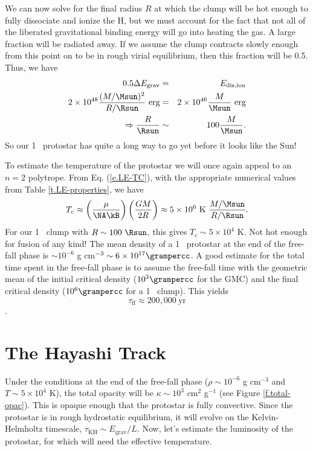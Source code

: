 We can now solve for the final radius $R$ at which the clump will be hot enough to fully dissociate and ionize the H, but we must account for the fact that not all of the liberated gravitational binding energy will go into heating the gas.
A large fraction will be radiated away.
If we assume the clump contracts slowly enough from this point on to be in rough virial equilibrium, then this fraction will be 0.5.
Thus, we have
\begin{eqnarray}
  0.5 \Delta E_\mathrm{grav} &=& E_\mathrm{dis,ion} \nonumber\\
  2\times10^{48} \frac{(M/\Msun)^2}{R/\Rsun}\ \mathrm{erg} &=& 2\times10^{46} \frac{M}{\Msun}\ \mathrm{erg} \nonumber\\
  \Rightarrow \frac{R}{\Rsun} &\sim& 100\frac{M}{\Msun}.\label{e.proto-rad}
\end{eqnarray}
So our 1 \Msun\ protostar has quite a long way to go yet before it looks like the Sun!

To estimate the temperature of the protostar we will once again appeal to an $n=2$ polytrope.
From Eq. (\ref{e.LE-TC}), with the appropriate numerical values from Table \ref{t.LE-properties}, we have
\begin{equation}
  T_c \approx \left(\frac{\mu}{\NA\kB}\right) \left(\frac{GM}{2R}\right)
  \approx 5\times10^6\ \mathrm{K}\ \frac{M/\Msun}{R/\Rsun}.
\end{equation}
For our 1 \Msun\ clump with $R\sim100\ \Rsun$, this gives $T_c \sim 5\times10^4$ K.
Not hot enough for fusion of any kind!
The mean density of a 1 \Msun\ protostar at the end of the free-fall phase is $\sim10^{-6}$ g cm$^{-3} \sim 6\times10^{17} \grampercc$.
A good estimate for the total time spent in the free-fall phase is to assume the free-fall time with the geometric mean of the initial critical density ($10^3\grampercc$ for the GMC) and the final critical density ($10^6\grampercc$ for a 1 \Msun\ clump).
This yields
\[ \tau_\mathrm{ff} \approx 200,000\ \mathrm{yr}\].


\section{The Hayashi Track}\label{s.Hayashi}

Under the conditions at the end of the free-fall phase ($\rho\sim10^{-6}$ g cm$^{-3}$ and $T\sim5\times10^4$ K), the total opacity will be $\kappa \sim 10^3$ cm$^{2}$ g$^{-1}$ (see Figure \ref{f.total-opac}).
This is opaque enough that the protostar is fully convective.
Since the protostar is in rough hydrostatic equilibrium, it will evolve on the Kelvin-Helmholtz timescale, $\tau_\mathrm{KH} \sim E_\mathrm{grav}/L$.
Now, let's estimate the luminosity of the protostar, for which will need the effective temperature.

